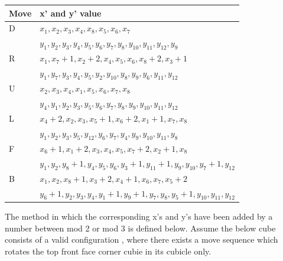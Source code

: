 \documentclass{article}
\begin{document}
\begin{center}
\label{:paritytable}
    \begin{tabular}{ | l | p{12cm} |}
    \hline
    Move & x' and y' value \\ \hline
    D &  $x_1,x_2,x_3,x_4,x_8,x_5,x_6,x_7$ \\
& $y_1,y_2,y_3,y_4,y_5,y_6,y_7,y_8,y_{10},y_{11},y_{12},y_9$\\ \hline
    R &  $x_1,x_7 +1,x_2 +2,x_4,x_5,x_6,x_8 +2,x_3 +1$\\ & $y_1,y_7,y_3,y_4,y_5,y_2,y_{10},y_{8},y_{9},y_{6},y_{11},y_{12}$\\ \hline
    U &  $x_2,x_3,x_4,x_1,x_5,x_6,x_7,x_8$ \\ & $y_4,y_1,y_2,y_3,y_5,y_6,y_{7},y_{8},y_{9},y_{10},y_{11},y_{12}$\\ \hline
    L & $x_4 +2,x_2,x_3,x_5 + 1,x_6 +2,x_1 + 1,x_7,x_8$ \\
& $y_1,y_2,y_3,y_5,y_12,y_6,y_{7},y_{4},y_{9},y_{10},y_{11},y_{8}$\\ \hline
    F &  $x_6 +1,x_1 +2,x_3,x_4,x_5,x_7 +2,x_2 +1,x_8$\\
& $y_1,y_2,y_8 +1,y_4,y_5,y_6,y_{3}+1,y_{11}+1,y_{9},y_{10},y_{7}+1,y_{12}$\\ \hline
    B &  $x_1,x_2,x_8 +1,x_3 + 2,x_4 + 1,x_6,x_7,x_5 +2$ \\
&$y_6 +1,y_2,y_3,y_4,y_1 +1,y_9 +1,y_{7},y_{8},y_{5}+1,y_{10},y_{11},y_{12}$\\ \hline
    \end{tabular}
\end{center}
The method in which the corresponding x's and y's have been added by a number between mod 2 or mod 3 is defined below. Assume the below cube consists of a valid configuration , where there exists a move sequence which rotates the top front face corner cubie in its cubicle only. 
\end{document}
